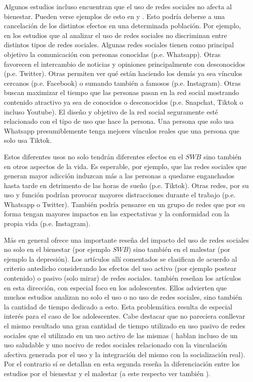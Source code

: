 \documentclass[11pt]{article}
\begin{document}
Algunos estudios incluso encuentran que el uso de redes sociales no afecta al bienestar. Pueden verse ejemplos de esto en  y . Esto podría deberse a una cancelación de los distintos efectos en una determinada población. Por ejemplo, en los estudios que al analizar el uso de redes sociales no discriminan entre distintos tipos de redes sociales. Algunas redes sociales tienen como principal objetivo la comunicación con personas conocidas (p.e. Whatsapp). Otras favorecen el intercambio de noticias y opiniones principalmente con desconocidos (p.e. Twitter). Otras permiten ver qué están haciendo los demás ya sea vínculos cercanos (p.e. Facebook) o sumando también a famosos (p.e. Instagram). Otras buscan maximizar el tiempo que las personas pasan en la red social mostrando contenido atractivo ya sea de conocidos o desconocidos (p.e. Snapchat, Tiktok o incluso Youtube). El diseño y objetivo de la red social seguramente esté relacionado con el tipo de uso que hace la persona. Una persona que solo usa Whatsapp presumiblemente tenga mejores vínculos reales que una persona que solo usa Tiktok. 

Estos diferentes usos no solo tendrán diferentes efectos en el $SWB$ sino también en otros aspectos de la vida. Es esperable, por ejemplo, que las redes sociales que generan mayor adicción induzcan más a las personas a quedarse enganchados hasta tarde en detrimento de las horas de sueño (p.e. Tiktok). Otras redes, por su uso y función podrían provocar mayores distracciones durante el trabajo (p.e. Whatsapp o Twitter). También podría pensarse en un grupo de redes que por su forma tengan mayores impactos en las expectativas y la conformidad con la propia vida (p.e. Instagram). 

Más en general  ofrece una importante reseña del impacto del uso de redes sociales no solo en el bienestar (por ejemplo $SWB$) sino también en el malestar (por ejemplo la depresión). Los artículos allí comentados se clasifican de acuerdo al criterio antedicho considerando los efectos del uso activo (por ejemplo postear contenido) o pasivo (solo mirar) de redes sociales.  también reseñan los artículos en esta dirección, con especial foco en los adolescentes. Ellos advierten que muchos estudios analizan no solo el uso o no uso de redes sociales, sino también la cantidad de tiempo dedicado a esto. Esta problemática resulta de especial interés para el caso de los adolescentes. Cabe destacar que no pareciera conllevar el mismo resultado una gran cantidad de tiempo utilizado en uso pasivo de redes sociales que el utilizado en un uso activo de las mismas ( hablan incluso de un uso saludable y uno nocivo de redes sociales relacionado con la vinculación afectiva generada por el uso y la integración del mismo con la socialización real). Por el contrario sí se detallan en esta segunda reseña la diferenciación entre los estudios por el bienestar y el malestar (a este respecto ver también ). 
\end{document}
